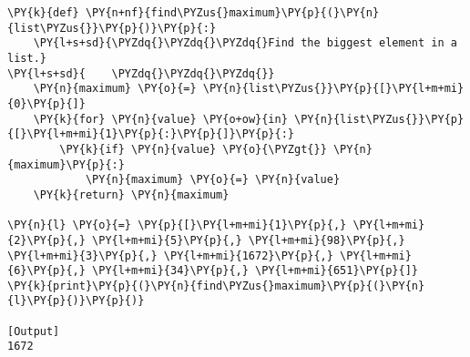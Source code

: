 \begin{Verbatim}[label=\makebox{\url{https://github.com/lucabaldini/cmepda/tree/master/slides/latex/snippets/find\_max.py}},commandchars=\\\{\}]
\PY{k}{def} \PY{n+nf}{find\PYZus{}maximum}\PY{p}{(}\PY{n}{list\PYZus{}}\PY{p}{)}\PY{p}{:}
    \PY{l+s+sd}{\PYZdq{}\PYZdq{}\PYZdq{}Find the biggest element in a list.}
\PY{l+s+sd}{    \PYZdq{}\PYZdq{}\PYZdq{}}
    \PY{n}{maximum} \PY{o}{=} \PY{n}{list\PYZus{}}\PY{p}{[}\PY{l+m+mi}{0}\PY{p}{]}
    \PY{k}{for} \PY{n}{value} \PY{o+ow}{in} \PY{n}{list\PYZus{}}\PY{p}{[}\PY{l+m+mi}{1}\PY{p}{:}\PY{p}{]}\PY{p}{:}
        \PY{k}{if} \PY{n}{value} \PY{o}{\PYZgt{}} \PY{n}{maximum}\PY{p}{:}
            \PY{n}{maximum} \PY{o}{=} \PY{n}{value}
    \PY{k}{return} \PY{n}{maximum}

\PY{n}{l} \PY{o}{=} \PY{p}{[}\PY{l+m+mi}{1}\PY{p}{,} \PY{l+m+mi}{2}\PY{p}{,} \PY{l+m+mi}{5}\PY{p}{,} \PY{l+m+mi}{98}\PY{p}{,} \PY{l+m+mi}{3}\PY{p}{,} \PY{l+m+mi}{1672}\PY{p}{,} \PY{l+m+mi}{6}\PY{p}{,} \PY{l+m+mi}{34}\PY{p}{,} \PY{l+m+mi}{651}\PY{p}{]}
\PY{k}{print}\PY{p}{(}\PY{n}{find\PYZus{}maximum}\PY{p}{(}\PY{n}{l}\PY{p}{)}\PY{p}{)}

[Output]
1672
\end{Verbatim}